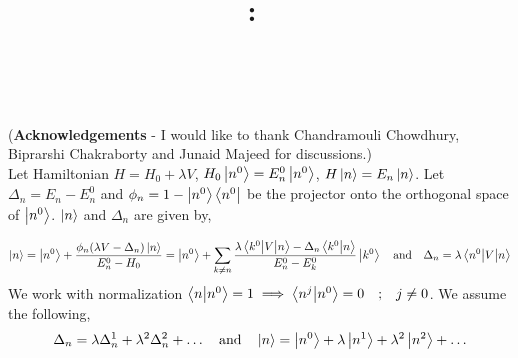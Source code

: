 \documentclass{article}
\title{
    \textmd{\textbf{\hmwkClass:\ \hmwkTitle}}\\
    \normalsize\vspace{0.1in}\small{\hmwkDueDate\ }\\
}
\author{\hmwkAuthorName}
\date{}
\begin{document}
\maketitle
(\textbf{Acknowledgements} - I would like to thank Chandramouli Chowdhury, Biprarshi Chakraborty and Junaid Majeed for discussions.)
\\

	Let Hamiltonian $ H = H_0  + \lambda V$, $ H_0\ket{n^{0}} = E_n^{0}\ket{n^{0}}  $, $ H\ket{n} = E_n \ket{n} $. Let $ \Delta_n = E_n - E_n^{0} $ and $ \phi_n = 1 - \ket{n^{0}}\bra{n^{0}} $ be the projector onto the orthogonal space of $ \ket{n^{0}} $. $ \ket{n} $ and $ \Delta_n $ are given by,

	\begin{equation*}
	\ket{n} =\ket{n^{0}} + \dfrac{ \phi_n (\lambda V - \Delta_n)\ket{n}}{E_n^{0} - H_0} = \ket{n^{0}} +\sum_{k\ne n} \dfrac{ \lambda \mel{k^0}{V}{n} - \Delta_n \ip{k^{0}}{n}}{E_n^{0} - E_k^{0}}\ket{k^{0}} \qq{and} \Delta_n = \lambda \mel{n^{0}}{V}{n} 
	\end{equation*}	
	We work with normalization $ \ip{n}{n^0} = 1 \implies \ip{n^j}{n^0} = 0 \qq{;} j\ne0$. 
	We assume the following,
	\begin{equation*}
	\Delta_n = \lambda \Delta^{1}_n + \lambda^2 \Delta_n^2 + \ldots \qq{and} \ket{n} = \ket{n^{0}} +  \lambda \ket{n^{1}} + \lambda^2 \ket{n^{2}} + \ldots
	\end{equation*}
	
\end{document}
